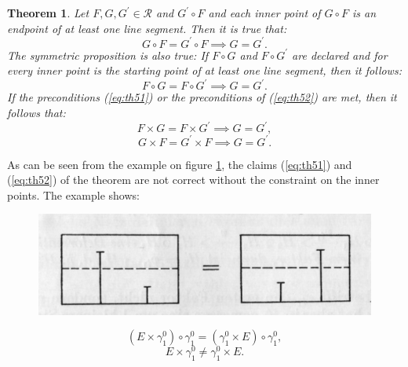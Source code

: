 \documentclass{article}
\newtheorem{theorem}{Theorem}
\begin{document}
\begin{theorem}
  \label{eq:th5}
  Let $F, G, G^{\prime} \in \mathcal{R}$ and $G^{\prime} \circ F$ and each inner point of $G \circ F$ is an endpoint of at least one line segment. Then it is true that:
  \begin{equation} G \circ F = G^{\prime} \circ F \implies G = G^{\prime}. \label{eq:th51} \end{equation}
  The symmetric proposition is also true: If $F \circ G$ and $F \circ G^{\prime}$ are declared and for every inner point is the starting point of at least one line segment, then it follows:
  \begin{equation} F \circ G = F \circ G^{\prime} \implies G = G^{\prime}. \label{eq:th52} \end{equation}
  If the preconditions (\ref{eq:th51}) or the preconditions of (\ref{eq:th52}) are met, then it follows that:
  \begin{equation} F \times G = F \times G^{\prime} \implies G = G^{\prime}, \label{eq:th53} \end{equation}
  \begin{equation} G \times F = G^{\prime} \times F \implies G = G^{\prime}. \label{eq:th54} \end{equation}
\end{theorem}

As can be seen from the example on figure \ref{fig:figure13}, the claims (\ref{eq:th51}) and (\ref{eq:th52}) of the theorem are not correct without the constraint on the inner points. The example shows:
\begin{figure}
  \includegraphics[]{figure13.png}
  \centering
  \caption{}
  \label{fig:figure13}
\end{figure}

  \begin{equation*} (E \times \gamma_1^0) \circ \gamma_1^0 = (\gamma_1^0 \times E) \circ \gamma_1^0, \end{equation*}
  \begin{equation*} E \times \gamma_1^0 \neq \gamma_1^0 \times E.  \end{equation*}
\end{document}
